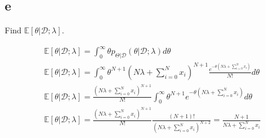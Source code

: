 \documentclass[12pt]{article}
\begin{document}
\subsection{e}
Find $\mathbb{E} [\theta | \mathcal{D} ; \lambda]$.
\begin{qsolve}
    \begin{gather*}
        \mathbb{E} [\theta | \mathcal{D} ; \lambda] = \int_{0}^{\infty} \theta p_{\Theta | \mathcal{D}}(\theta | \mathcal{D} ; \lambda) d\theta\\
        \mathbb{E} [\theta | \mathcal{D} ; \lambda] = \int_{0}^{\infty} \theta^{N+1} (N \lambda + \sum_{i=0}^{N} x_i)^{N+1}\frac{e^{-\theta(N \lambda + \sum_{i=0}^{N} x_i)}}{N!} d\theta\\
        \mathbb{E} [\theta | \mathcal{D} ; \lambda] = \frac{(N \lambda + \sum_{i=0}^{N} x_i)^{N+1}}{N!} \int_{0}^{\infty} \theta^{N+1}e^{-\theta(N \lambda + \sum_{i=0}^{N} x_i)} d\theta \\
        \mathbb{E} [\theta | \mathcal{D} ; \lambda] = \frac{(N \lambda + \sum_{i=0}^{N} x_i)^{N+1}}{N!} \frac{(N+1)!}{(N \lambda + \sum_{i=0}^{N} x_i)^{N+2}} = \frac{N+1}{N \lambda + \sum_{i=0}^{N} x_i}
    \end{gather*}
\end{qsolve}





\clearpage
\end{document}
